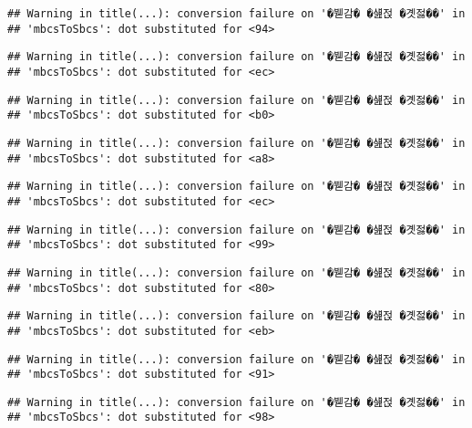 \documentclass[
]{article}
\begin{document}
\begin{verbatim}
## Warning in title(...): conversion failure on '�붿감� �섎젅 �곗젏��' in
## 'mbcsToSbcs': dot substituted for <94>
\end{verbatim}

\begin{verbatim}
## Warning in title(...): conversion failure on '�붿감� �섎젅 �곗젏��' in
## 'mbcsToSbcs': dot substituted for <ec>
\end{verbatim}

\begin{verbatim}
## Warning in title(...): conversion failure on '�붿감� �섎젅 �곗젏��' in
## 'mbcsToSbcs': dot substituted for <b0>
\end{verbatim}

\begin{verbatim}
## Warning in title(...): conversion failure on '�붿감� �섎젅 �곗젏��' in
## 'mbcsToSbcs': dot substituted for <a8>
\end{verbatim}

\begin{verbatim}
## Warning in title(...): conversion failure on '�붿감� �섎젅 �곗젏��' in
## 'mbcsToSbcs': dot substituted for <ec>
\end{verbatim}

\begin{verbatim}
## Warning in title(...): conversion failure on '�붿감� �섎젅 �곗젏��' in
## 'mbcsToSbcs': dot substituted for <99>
\end{verbatim}

\begin{verbatim}
## Warning in title(...): conversion failure on '�붿감� �섎젅 �곗젏��' in
## 'mbcsToSbcs': dot substituted for <80>
\end{verbatim}

\begin{verbatim}
## Warning in title(...): conversion failure on '�붿감� �섎젅 �곗젏��' in
## 'mbcsToSbcs': dot substituted for <eb>
\end{verbatim}

\begin{verbatim}
## Warning in title(...): conversion failure on '�붿감� �섎젅 �곗젏��' in
## 'mbcsToSbcs': dot substituted for <91>
\end{verbatim}

\begin{verbatim}
## Warning in title(...): conversion failure on '�붿감� �섎젅 �곗젏��' in
## 'mbcsToSbcs': dot substituted for <98>
\end{verbatim}
\end{document}
